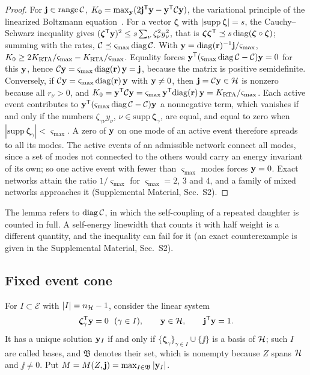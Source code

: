 \begin{proof}
For $\mathbf j\in\mathrm{range}\,\mathcal C$, $K_0=\max_{\mathbf y}(2\mathbf j^{\mathsf T}\mathbf y-\mathbf y^{\mathsf T}\mathcal C\mathbf y)$, the variational principle of
the linearized Boltzmann equation~\cite{Ziman2001}. For a vector $\bm\zeta$ with $|\mathrm{supp}\,\bm\zeta|=s$,
the Cauchy--Schwarz inequality gives $(\bm\zeta^{\mathsf T}\mathbf y)^2\le s\sum_\nu\zeta_\nu^2y_\nu^2$, that is
$\bm\zeta\bm\zeta^{\mathsf T}\preceq s\,\mathrm{diag}(\bm\zeta\circ\bm\zeta)$; summing with the rates,
$\mathcal C\preceq\varsigma_{\max}\,\mathrm{diag}\,\mathcal C$. With $\mathbf y=\mathrm{diag}(\mathbf r)^{-1}\mathbf j/\varsigma_{\max}$,
$K_0\ge2K_{\rm RTA}/\varsigma_{\max}-K_{\rm RTA}/\varsigma_{\max}$. Equality forces
$\mathbf y^{\mathsf T}(\varsigma_{\max}\,\mathrm{diag}\,\mathcal C-\mathcal C)\mathbf y=0$ for this $\mathbf y$, hence
$\mathcal C\mathbf y=\varsigma_{\max}\,\mathrm{diag}(\mathbf r)\,\mathbf y=\mathbf j$, because the matrix is positive semidefinite.
Conversely, if $\mathcal C\mathbf y=\varsigma_{\max}\,\mathrm{diag}(\mathbf r)\,\mathbf y$ with $\mathbf y\ne0$, then
$\mathbf j=\mathcal C\mathbf y\in\mathcal H$ is nonzero because all $r_\nu>0$, and
$K_0=\mathbf y^{\mathsf T}\mathcal C\mathbf y=\varsigma_{\max}\,\mathbf y^{\mathsf T}\mathrm{diag}(\mathbf r)\,\mathbf y=K_{\rm RTA}/\varsigma_{\max}$. Each active event contributes to
$\mathbf y^{\mathsf T}(\varsigma_{\max}\,\mathrm{diag}\,\mathcal C-\mathcal C)\mathbf y$ a nonnegative term, which vanishes if and only if the
numbers $\zeta_{\gamma\nu}y_\nu$, $\nu\in\mathrm{supp}\,\bm\zeta_\gamma$, are equal, and equal to zero when
$|\mathrm{supp}\,\bm\zeta_\gamma|<\varsigma_{\max}$. A zero of $\mathbf y$ on one mode of an active event therefore
spreads to all its modes. The active events of an admissible network connect all modes, since a set of
modes not connected to the others would carry an energy invariant of its own; so one active event with
fewer than $\varsigma_{\max}$ modes forces $\mathbf y=0$. Exact networks attain the ratio $1/\varsigma_{\max}$ for
$\varsigma_{\max}=2$, $3$ and $4$, and a family of mixed networks approaches it (Supplemental Material,
Sec.~S2).
\end{proof}

The lemma refers to $\mathrm{diag}\,\mathcal C$, in which the self-coupling of a repeated daughter is counted
in full. A self-energy linewidth that counts it with half weight is a different quantity, and the
inequality can fail for it (an exact counterexample is given in the Supplemental Material, Sec.~S2).

\subsection{Fixed event cone}\label{sec:cone}

\begin{definition}\label{def:M}
For $I\subset\mathcal E$ with $|I|=n_{\mathcal H}-1$, consider the linear system
\begin{equation}
\bm\zeta_\gamma\tr\yy=0\ \ (\gamma\in I),\qquad \yy\in\Hsp,\qquad \jj\tr\yy=1 .
\label{eq:basic}
\end{equation}
It has a unique solution $\mathbf y_I$ if and only if $\{\bm\zeta_\gamma\}_{\gamma\in I}\cup\{\jj\}$ is a basis
of $\mathcal H$; such $I$ are called bases, and $\mathfrak B$ denotes their set, which is nonempty because $Z$
spans $\mathcal H$ and $\jj\ne0$. Put $M=M(Z,\mathbf j)=\max_{I\in\mathfrak B}|\mathbf y_I|$.
\end{definition}

